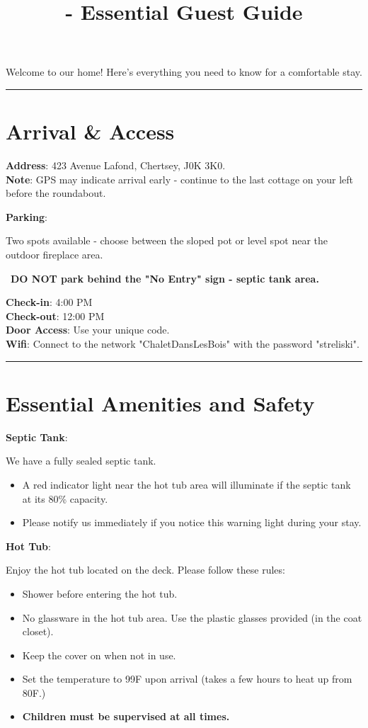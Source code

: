 \documentclass{article}
\title{\chalet - Essential Guest Guide}
\newcommand*{\warnsign}{\begin{LARGE}\texttwemoji{warning}\end{LARGE}}
\newcommand{\separator}{\vspace{2em}\hrule}
\newcommand*{\subhead}[2]{\noindent\textbf{#1}: {#2}\vspace{1em}}
\newcommand*{\note}[1]{\textbf{Note}: {#1}}
\newcommand*{\warning}[1]{\warnsign \ \textbf{#1} \warnsign}
\begin{document}
\maketitle

Welcome to our home! Here's everything you need to know for a comfortable stay.

\separator
\section*{Arrival \& Access}

\subhead{Address} {
    423 Avenue Lafond, Chertsey, J0K 3K0.
    \\
    \note{GPS may indicate arrival early - continue to the last cottage on your left before the roundabout.}
}

\subhead{Parking} {
    Two spots available - choose between the sloped pot or level spot near the outdoor fireplace area.
    \\
    \warning{DO NOT park behind the "No Entry" sign - septic tank area.}
}

\subhead{Check-in} {4:00 PM}\\
\subhead{Check-out} {12:00 PM}\\
\subhead{Door Access} {Use your unique code.}\\
\subhead{Wifi} {Connect to the network "ChaletDansLesBois" with the password "streliski".}

\separator
\section*{Essential Amenities and Safety}
\subhead{Septic Tank} { We have a fully sealed septic tank.
    \begin{itemize}
        \item A red indicator light near the hot tub area will illuminate if the septic tank at its 80\% capacity.
        \item Please notify us immediately if you notice this warning light during your stay.
    \end{itemize}
}

\subhead{Hot Tub} { Enjoy the hot tub located on the deck. Please follow these rules:
    \begin{itemize}
        \item Shower before entering the hot tub.
        \item No glassware in the hot tub area. Use the plastic glasses provided (in the coat closet).
        \item Keep the cover on when not in use.
        \item Set the temperature to 99\textdegree F upon arrival (takes a few hours to heat up from 80\textdegree F.)
        \item \textbf{Children must be supervised at all times.}
    \end{itemize}
}
\end{document}
